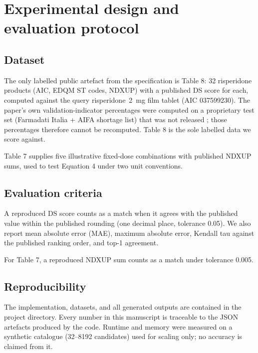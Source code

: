 \documentclass[12pt]{article}
\begin{document}
\section{Experimental design and evaluation protocol}
\label{sec:experiment}

\subsection{Dataset}
\label{sec:data}

The only labelled public artefact from the specification is Table 8: 32 risperidone products (AIC, EDQM ST codes, NDXUP) with a published DS score for each, computed against the query risperidone~2~mg film tablet (AIC 037599230). The paper's own validation-indicator percentages were computed on a proprietary test set (Farmadati Italia + AIFA shortage list) that was not released \citep{caviglioli2025medicine}; those percentages therefore cannot be recomputed. Table 8 is the sole labelled data we score against.

Table 7 supplies five illustrative fixed-dose combinations with published NDXUP sums, used to test Equation 4 under two unit conventions.

\subsection{Evaluation criteria}
\label{sec:criteria}

A reproduced DS score counts as a match when it agrees with the published value within the published rounding (one decimal place, tolerance 0.05). We also report mean absolute error (MAE), maximum absolute error, Kendall tau against the published ranking order, and top-1 agreement.

For Table 7, a reproduced NDXUP sum counts as a match under tolerance 0.005.

\subsection{Reproducibility}
\label{sec:repro}

The implementation, datasets, and all generated outputs are contained in the project directory. Every number in this manuscript is traceable to the JSON artefacts produced by the code. Runtime and memory were measured on a synthetic catalogue (32--8192 candidates) used for scaling only; no accuracy is claimed from it.

\end{document}

